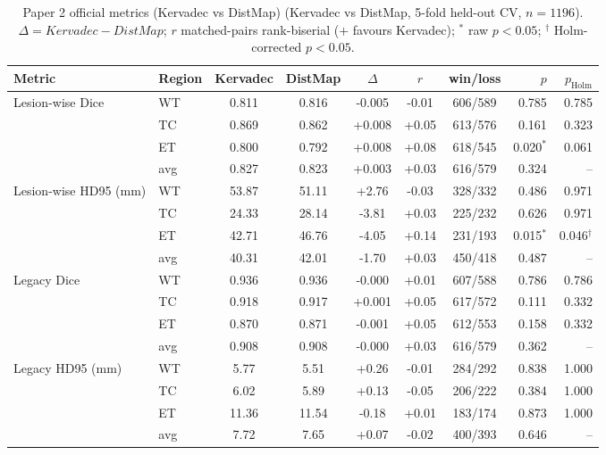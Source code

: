 \begin{table}[t]
\centering
\caption{Paper 2 official metrics (Kervadec vs DistMap) (Kervadec vs DistMap, 5-fold held-out CV, $n=1196$). $\Delta=Kervadec-DistMap$; $r$ matched-pairs rank-biserial ($+$ favours Kervadec); $^{*}$ raw $p<0.05$; $^{\dagger}$ Holm-corrected $p<0.05$.}
\label{tab:p2_distmap_main}
\begin{tabular}{llcccccrr}
\toprule
Metric & Region & Kervadec & DistMap & $\Delta$ & $r$ & win/loss & $p$ & $p_{\mathrm{Holm}}$ \\
\midrule
\multirow{4}{*}{Lesion-wise Dice} & WT & 0.811 & 0.816 & -0.005 & -0.01 & 606/589 & 0.785 & 0.785 \\
 & TC & 0.869 & 0.862 & +0.008 & +0.05 & 613/576 & 0.161 & 0.323 \\
 & ET & 0.800 & 0.792 & +0.008 & +0.08 & 618/545 & 0.020$^{*}$ & 0.061 \\
 & avg & 0.827 & 0.823 & +0.003 & +0.03 & 616/579 & 0.324 & -- \\
\midrule
\multirow{4}{*}{Lesion-wise HD95 (mm)} & WT & 53.87 & 51.11 & +2.76 & -0.03 & 328/332 & 0.486 & 0.971 \\
 & TC & 24.33 & 28.14 & -3.81 & +0.03 & 225/232 & 0.626 & 0.971 \\
 & ET & 42.71 & 46.76 & -4.05 & +0.14 & 231/193 & 0.015$^{*}$ & 0.046$^{\dagger}$ \\
 & avg & 40.31 & 42.01 & -1.70 & +0.03 & 450/418 & 0.487 & -- \\
\midrule
\multirow{4}{*}{Legacy Dice} & WT & 0.936 & 0.936 & -0.000 & +0.01 & 607/588 & 0.786 & 0.786 \\
 & TC & 0.918 & 0.917 & +0.001 & +0.05 & 617/572 & 0.111 & 0.332 \\
 & ET & 0.870 & 0.871 & -0.001 & +0.05 & 612/553 & 0.158 & 0.332 \\
 & avg & 0.908 & 0.908 & -0.000 & +0.03 & 616/579 & 0.362 & -- \\
\midrule
\multirow{4}{*}{Legacy HD95 (mm)} & WT & 5.77 & 5.51 & +0.26 & -0.01 & 284/292 & 0.838 & 1.000 \\
 & TC & 6.02 & 5.89 & +0.13 & -0.05 & 206/222 & 0.384 & 1.000 \\
 & ET & 11.36 & 11.54 & -0.18 & +0.01 & 183/174 & 0.873 & 1.000 \\
 & avg & 7.72 & 7.65 & +0.07 & -0.02 & 400/393 & 0.646 & -- \\
\midrule
\bottomrule
\end{tabular}
\end{table}

